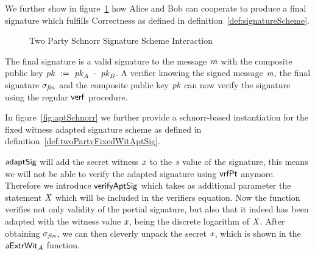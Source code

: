 We further show in figure~\ref{fig:twoparty-schnorr-prot} how Alice and Bob can cooperate to produce a final signature which fulfills Correctness as defined in definition~\ref{def:signatureScheme}.

\begin{figure}
    \centering
    \caption{Two Party Schnorr Signature Scheme Interaction}
    \label{fig:twoparty-schnorr-prot}
\end{figure}

The final signature is a valid signature to the message $\mathit{m}$ with the composite public key $\mathit{pk} ~:=~ \mathit{pk}_{\mathit{A}} ~\cdot~ \mathit{pk}_{\mathit{B}}$.
A verifier knowing the signed message $\mathit{m}$, the final signature $\sigma_{\mathit{fin}}$ and the composite public key $\mathit{pk}$ can now verify the signature using the regular $\mathsf{verf}$ procedure.

In figure~\ref{fig:aptSchnorr} we further provide a schnorr-based instantiation for the fixed witness adapted signature scheme as defined in definition~\ref{def:twoPartyFixedWitAptSig}.

$\mathsf{adaptSig}$ will add the secret witness $\mathit{x}$ to the $\mathit{s}$ value of the signature, this means we will not be able to verify the adapted signature using $\mathsf{vrfPt}$ anymore. Therefore we
introduce $\mathsf{verifyAptSig}$ which takes as additional parameter the statement $\mathit{X}$ which will be included in the verifiers equation. Now the function verifies not only validity of the portial
signature, but also that it indeed has been adapted with the witness value $\mathit{x}$, being the discrete logarithm of $\mathit{X}$. After obtaining $\sigma_{\mathit{fin}}$, we can then cleverly unpack the secret $\mathit{x}$,
which is shown in the $\mathsf{aExtrWit_{\mathcal{A}}}$ function.

